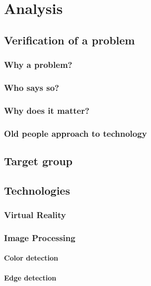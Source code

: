 \chapter{Analysis}
	
	
	\section{Verification of a problem}\label{sec:verification}
		\subsection{Why a problem?}
		
		\subsection{Who says so?}
		
		\subsection{Why does it matter?}
		
		\subsection{Old people approach to technology}

	\section{Target group}\label{sec:targetGroup}

	\section{Technologies}\label{sec:technologies}
		\subsection{Virtual Reality}
		\subsection{Image Processing}
			\subsubsection{Color detection}
			\subsubsection{Edge detection}
